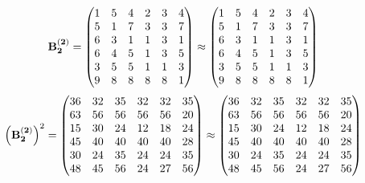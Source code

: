 \documentclass[10pt,a4paper]{article}
\begin{document}
	\[
		\bold{B_2^{(2)}} = 
		\begin{pmatrix}
			{1}{} & {{5}}{} & {{4}}{} & {{2}}{} & {{3}}{} & {{4}}{} \\
			{{5}}{} & {1}{} & {{7}}{} & {{3}}{} & {{3}}{} & {{7}}{} \\
			{{6}}{} & {{3}}{} & {1}{} & {1}{} & {{3}}{} & {1}{} \\
			{{6}}{} & {{4}}{} & {{5}}{} & {1}{} & {{3}}{} & {{5}}{} \\
			{{3}}{} & {{5}}{} & {{5}}{} & {1}{} & {1}{} & {{3}}{} \\
			{{9}}{} & {{8}}{} & {{8}}{} & {{8}}{} & {{8}}{} & {1}{} \\
		\end{pmatrix}
		\approx
		\begin{pmatrix}
			1        & 5        & 4        & 2        & 3        & 4        \\
			5        & 1        & 7        & 3        & 3        & 7        \\
			6        & 3        & 1        & 1        & 3        & 1        \\
			6        & 4        & 5        & 1        & 3        & 5        \\
			3        & 5        & 5        & 1        & 1        & 3        \\
			9        & 8        & 8        & 8        & 8        & 1        \\
		\end{pmatrix}
	\]
	\[
		\left(\bold{B_2^{(2)}}\right)^{2} = 
		\begin{pmatrix}
			{{36}}{} & {{32}}{} & {{35}}{} & {{32}}{} & {{32}}{} & {{35}}{} \\
			{{63}}{} & {{56}}{} & {{56}}{} & {{56}}{} & {{56}}{} & {{20}}{} \\
			{{15}}{} & {{30}}{} & {{24}}{} & {{12}}{} & {{18}}{} & {{24}}{} \\
			{{45}}{} & {{40}}{} & {{40}}{} & {{40}}{} & {{40}}{} & {{28}}{} \\
			{{30}}{} & {{24}}{} & {{35}}{} & {{24}}{} & {{24}}{} & {{35}}{} \\
			{{48}}{} & {{45}}{} & {{56}}{} & {{24}}{} & {{27}}{} & {{56}}{} \\
		\end{pmatrix}
		\approx
		\begin{pmatrix}
			36       & 32       & 35       & 32       & 32       & 35       \\
			63       & 56       & 56       & 56       & 56       & 20       \\
			15       & 30       & 24       & 12       & 18       & 24       \\
			45       & 40       & 40       & 40       & 40       & 28       \\
			30       & 24       & 35       & 24       & 24       & 35       \\
			48       & 45       & 56       & 24       & 27       & 56       \\
		\end{pmatrix}
	\]
\end{document}
